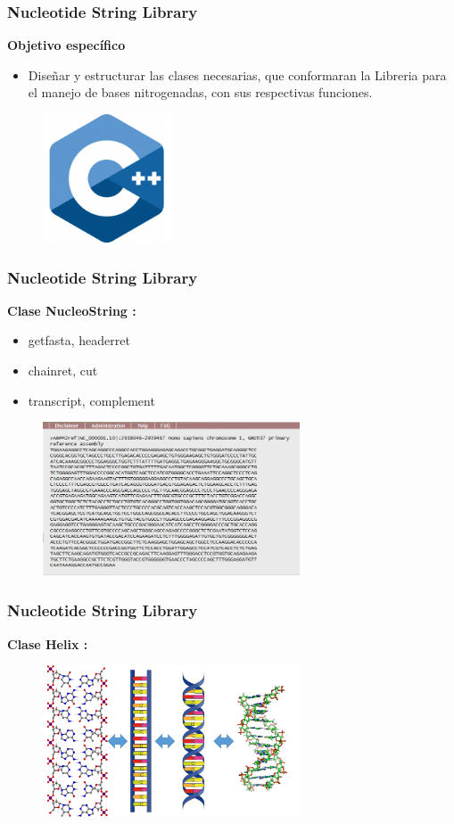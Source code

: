 \documentclass{beamer}
\begin{document}
\begin{frame}
\frametitle{Nucleotide String Library}
\textbf{\large{Objetivo específico}}
\begin{itemize}
\item Diseñar y estructurar las clases necesarias, que conformaran la Libreria para el manejo de bases nitrogenadas, con sus respectivas funciones.
\end{itemize}
\begin{figure}
		\includegraphics[width=1.5in]{C.png}
\end{figure}
\end{frame}

\begin{frame}
\frametitle{Nucleotide String Library}
\textbf{\large{Clase NucleoString :}}
\begin{itemize}
\item{getfasta, headerret}
\item{chainret, cut}
\item{transcript, complement}
\end{itemize}
\begin{figure}
		\includegraphics[width=3.0in]{fasta.png}
\end{figure}
\end{frame}

\begin{frame}
\frametitle{Nucleotide String Library}
\textbf{\large{Clase Helix :}}
\begin{figure}
		\includegraphics[width=3.0in]{ADN.png}
\end{figure}
\end{frame}
\end{document}
